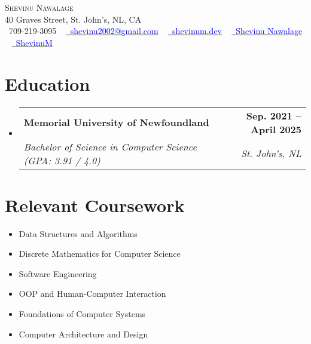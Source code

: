 \documentclass[letterpaper,11pt]{article}
\makeatletter
\newcommand{\resumeSubheading}[4]{
  \vspace{-2pt}\item
    \begin{tabular*}{1.0\textwidth}[t]{l@{\extracolsep{\fill}}r}
      \textbf{#1} & \textbf{\small #2} \\
      \textit{\small#3} & \textit{\small #4} \\
    \end{tabular*}\vspace{-7pt}
}
\newcommand{\resumeSubHeadingListStart}{\begin{itemize}[leftmargin=0.0in, label={}]}
\newcommand{\resumeSubHeadingListEnd}{\end{itemize}}
\makeatother
\begin{document}

\begin{center}
    {\Huge \scshape Shevinu Nawalage} \\ \vspace{1pt}
    40 Graves Street, St. John's, NL, CA \\ \vspace{1pt}
    \small \raisebox{-0.1\height}\faPhone\ 709-219-3095 ~ \href{mailto:shevinu2002@gmail.com}{\raisebox{-0.2\height}\faEnvelope\  {\textcolor{blue}{shevinu2002@gmail.com}}} ~ 
    \href{http://shevinum.dev}{\raisebox{-0.2\height}\faGlobe\ {\textcolor{blue}{shevinum.dev}}}  ~
    \href{https://www.linkedin.com/in/shevinu-nawalage-a109371bb/}{\raisebox{-0.2\height}\faLinkedin\ {\textcolor{blue}{Shevinu Nawalage}}}  ~
    \href{https://github.com/ShevinuM}{\raisebox{-0.2\height}\faGithub\ {\textcolor{blue}{ShevinuM}}}
    \vspace{-8pt}
\end{center}


\section{Education}
  \resumeSubHeadingListStart
    \resumeSubheading
      {Memorial University of Newfoundland}{Sep. 2021 -- April 2025}
      {Bachelor of Science in Computer Science (GPA: 3.91 / 4.0)}{St. John's, NL}
  \resumeSubHeadingListEnd
\section{Relevant Coursework}
        \begin{multicols}{1}
            \begin{itemize}[itemsep=-5pt, parsep=3pt]
                \item\small Data Structures and Algorithms
                \item Discrete Mathematics for Computer Science
                \item Software Engineering 
                \item OOP and Human-Computer Interaction
                \item Foundations of Computer Systems
                \item Computer Architecture and Design
            \end{itemize}
        \end{multicols}
        \vspace*{2.0\multicolsep}
\end{document}
